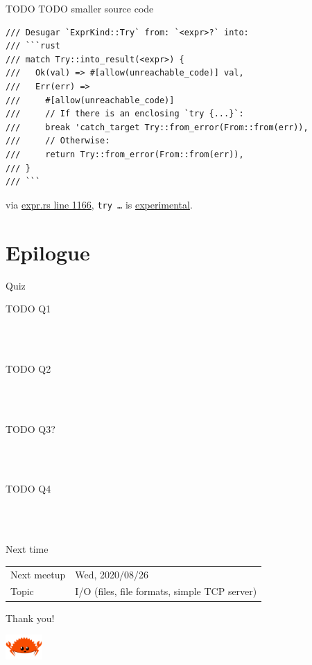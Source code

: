 \documentclass{beamer}
\begin{document}
\begin{frame}[fragile]{TODO}
  TODO smaller source code

  \begin{verbatim}
/// Desugar `ExprKind::Try` from: `<expr>?` into:
/// ```rust
/// match Try::into_result(<expr>) {
///   Ok(val) => #[allow(unreachable_code)] val,
///   Err(err) =>
///     #[allow(unreachable_code)]
///     // If there is an enclosing `try {...}`:
///     break 'catch_target Try::from_error(From::from(err)),
///     // Otherwise:
///     return Try::from_error(From::from(err)),
/// }
/// ```
  \end{verbatim}

  via \href{https://github.com/rust-lang/rust/blob/b613c989594f1cbf0d4af1a7a153786cca7792c8/src/librustc_ast_lowering/expr.rs#L1166}{expr.rs line 1166},
  \texttt{try {…}} is \href{https://github.com/rust-lang/rust/issues/31436}{experimental}.
\end{frame}


\section{Epilogue}


\begin{frame}[fragile]{Quiz}
  \begin{description}
    \item[TODO Q1] \hfill{} \\
      ~
    \item[TODO Q2] \hfill{} \\
      ~\uncover<3->{TODO}
    \item[TODO Q3?] \hfill{} \\
      ~
    \item[TODO Q4] \hfill{} \\
      ~
  \end{description}
\end{frame}


\begin{frame}[fragile]{Next time}
  \begin{tabular}{ll}
    Next meetup  & Wed, 2020/08/26 \\
    Topic        & I/O (files, file formats, simple TCP server)
  \end{tabular}
\end{frame}

\begin{frame}[standout]
  Thank you!

  \includegraphics[width=40pt]{images/rustacean-flat-happy.png}
\end{frame}
\end{document}
